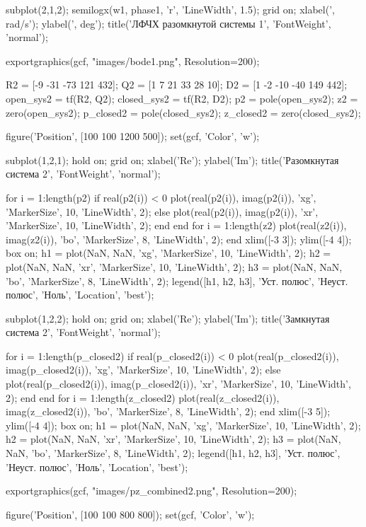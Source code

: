 \begin{matlabcode}
subplot(2,1,2);
semilogx(w1, phase1, 'r', 'LineWidth', 1.5);
grid on;
xlabel('\omega, rad/s');
ylabel('\phi, deg');
title('ЛФЧХ разомкнутой системы 1', 'FontWeight', 'normal');

exportgraphics(gcf, "images/bode1.png", Resolution=200);

R2 = [-9 -31 -73 121 432];
Q2 = [1 7 21 33 28 10];
D2 = [1 -2 -10 -40 149 442];
open_sys2 = tf(R2, Q2);
closed_sys2 = tf(R2, D2);
p2 = pole(open_sys2);
z2 = zero(open_sys2);
p_closed2 = pole(closed_sys2);
z_closed2 = zero(closed_sys2);


figure('Position', [100 100 1200 500]);
set(gcf, 'Color', 'w');

subplot(1,2,1);
hold on;
grid on;
xlabel('Re');
ylabel('Im');
title('Разомкнутая система 2', 'FontWeight', 'normal');

for i = 1:length(p2)
    if real(p2(i)) < 0
        plot(real(p2(i)), imag(p2(i)), 'xg', 'MarkerSize', 10, 'LineWidth', 2);
    else
        plot(real(p2(i)), imag(p2(i)), 'xr', 'MarkerSize', 10, 'LineWidth', 2);
    end
end
for i = 1:length(z2)
    plot(real(z2(i)), imag(z2(i)), 'bo', 'MarkerSize', 8, 'LineWidth', 2);
end
xlim([-3 3]);
ylim([-4 4]);
box on;
h1 = plot(NaN, NaN, 'xg', 'MarkerSize', 10, 'LineWidth', 2);
h2 = plot(NaN, NaN, 'xr', 'MarkerSize', 10, 'LineWidth', 2);
h3 = plot(NaN, NaN, 'bo', 'MarkerSize', 8, 'LineWidth', 2);
legend([h1, h2, h3], {'Уст. полюс', 'Неуст. полюс', 'Ноль'}, 'Location', 'best');

subplot(1,2,2);
hold on;
grid on;
xlabel('Re');
ylabel('Im');
title('Замкнутая система 2', 'FontWeight', 'normal');

for i = 1:length(p_closed2)
    if real(p_closed2(i)) < 0
        plot(real(p_closed2(i)), imag(p_closed2(i)), 'xg', 'MarkerSize', 10, 'LineWidth', 2);
    else
        plot(real(p_closed2(i)), imag(p_closed2(i)), 'xr', 'MarkerSize', 10, 'LineWidth', 2);
    end
end
for i = 1:length(z_closed2)
    plot(real(z_closed2(i)), imag(z_closed2(i)), 'bo', 'MarkerSize', 8, 'LineWidth', 2);
end
xlim([-3 5]);
ylim([-4 4]);
box on;
h1 = plot(NaN, NaN, 'xg', 'MarkerSize', 10, 'LineWidth', 2);
h2 = plot(NaN, NaN, 'xr', 'MarkerSize', 10, 'LineWidth', 2);
h3 = plot(NaN, NaN, 'bo', 'MarkerSize', 8, 'LineWidth', 2);
legend([h1, h2, h3], {'Уст. полюс', 'Неуст. полюс', 'Ноль'}, 'Location', 'best');

exportgraphics(gcf, "images/pz_combined2.png", Resolution=200);

figure('Position', [100 100 800 800]);
set(gcf, 'Color', 'w');


\end{matlabcode}
